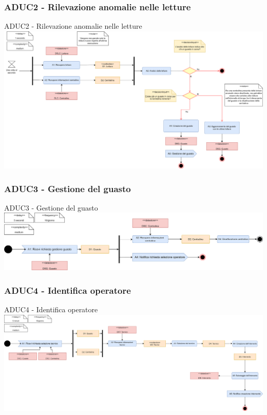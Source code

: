 \documentclass{beamer}
\begin{document}
		
		\begin{frame}
		\subsubsection{ADUC2 - Rilevazione anomalie nelle letture}		
		\begin{block}{ADUC2 - Rilevazione anomalie nelle letture}
			\includegraphics[width=\textwidth, height=0.85\textheight, keepaspectratio=true]{ADUC2.png}
		\end{block}
		\end{frame}

	
		\begin{frame}
		\subsubsection{ADUC3 - Gestione del guasto}	
			\begin{block}{ADUC3 - Gestione del guasto}
				\includegraphics[width=\textwidth, height=0.85\textheight, keepaspectratio=true]{ADUC3.png}
			\end{block}
		\end{frame}
	
		\begin{frame}
		\subsubsection{ADUC4 - Identifica operatore}	
			\begin{block}{ADUC4 - Identifica operatore}
				\includegraphics[width=\textwidth, height=0.85\textheight, keepaspectratio=true]{ADUC4.png}
			\end{block}
		\end{frame}
\end{document}

